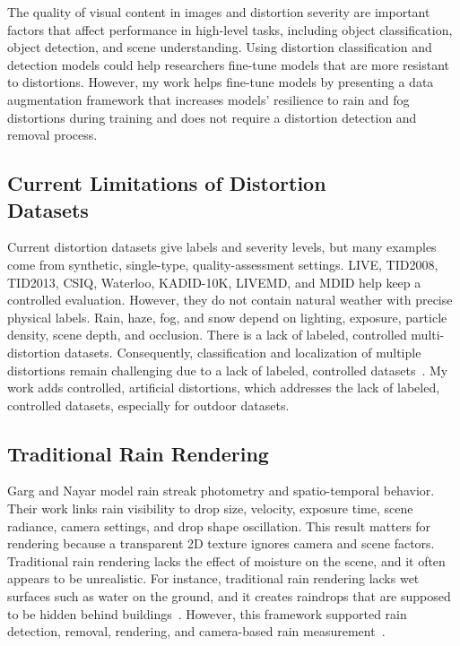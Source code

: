 \documentclass[10pt,letterpaper]{article}
\begin{document}
The quality of visual content in images and distortion severity are important factors that
affect performance in high-level tasks, including object classification, object detection, and
scene understanding. Using distortion classification and detection models could help
researchers fine-tune models that are more resistant to distortions. However, my work helps
fine-tune models by presenting a data augmentation framework that increases models'
resilience to rain and fog distortions during training and does not require a distortion
detection and removal process.


\subsection[Current Limitations of Distortion Datasets]{%
Current Limitations of Distortion\\
Datasets}


Current distortion datasets give labels and severity levels, but many examples come from
synthetic, single-type, quality-assessment settings. LIVE, TID2008, TID2013, CSIQ, Waterloo,
KADID-10K, LIVEMD, and MDID help keep a controlled evaluation. However, they do not contain
natural weather with precise physical labels. Rain, haze, fog, and snow depend on lighting, exposure, particle
density, scene depth, and occlusion. There is a lack of labeled, controlled multi-distortion
datasets. Consequently, classification and localization of multiple distortions remain
challenging due to a lack of labeled, controlled
datasets~\cite{muhammadaliqureshiDistortionClassificationComputer,
tremblayRainRenderingEvaluating2021}. My work adds controlled, artificial distortions, which
addresses the lack of labeled, controlled datasets, especially for outdoor datasets.


\subsection{Traditional Rain Rendering}

Garg and Nayar model rain streak photometry and spatio-temporal behavior. Their work links rain
visibility to drop size, velocity, exposure time, scene radiance, camera settings, and drop
shape oscillation. This result matters for rendering because a transparent 2D texture ignores
camera and scene factors. Traditional rain rendering lacks the effect of moisture on the scene,
and it often appears to be unrealistic. For instance, traditional rain rendering lacks wet
surfaces such as water on the ground, and it creates raindrops that are supposed to be hidden
behind buildings~\cite{tremblayRainRenderingEvaluating2021}.
However, this framework supported rain detection, removal, rendering, and camera-based rain
measurement~\cite{gargVisionRain2007}.
\end{document}
